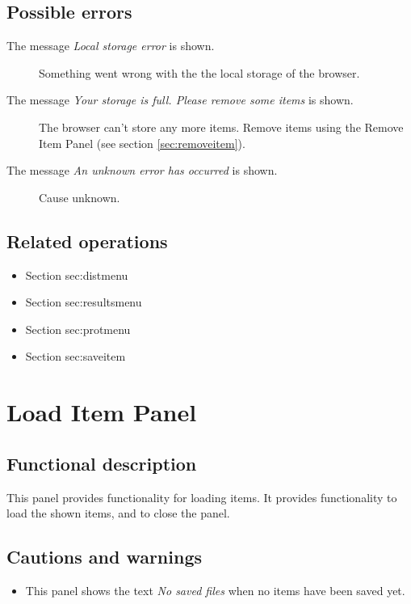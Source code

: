   \subsection*{Possible errors}
  \begin{description}
  \item[The message \emph{Local storage error} is shown.] Something went wrong with the the local storage of the browser.
  \item[The message \emph{Your storage is full. Please remove some items} is shown.] The browser can't store any more items. Remove items using the Remove Item Panel (see section \ref{sec:removeitem}).
  \item[The message \emph{An unknown error has occurred} is shown.] Cause unknown.
  \end{description}

  \subsection*{Related operations}
   \begin{itemize}
   \item Section {sec:distmenu}
   \item Section {sec:resultsmenu}
   \item Section {sec:protmenu}
   \item Section {sec:saveitem}
  \end{itemize}

\section{Load Item Panel}
\label{sec:loaditempanel}
  \subsection*{Functional description}
  This panel provides functionality for loading items. It provides functionality to load the shown items, and to close the panel.

  \subsection*{Cautions and warnings}
  \begin{itemize}
  \item This panel shows the text \emph{No saved files} when no items have been saved yet.
  \end{itemize}

